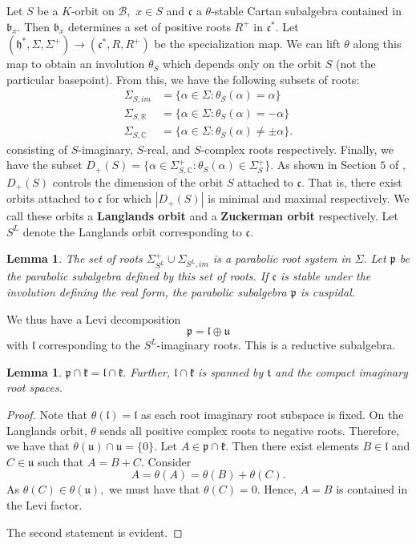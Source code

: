 \documentclass[letterpaper,twosided,11pt]{article}
\theoremstyle{plain}
\newtheorem{lemma}[theorem]{Lemma}
\theoremstyle{definition}
\theoremstyle{remark}
\newcommand{\C}{\mathbb{C}}
\newcommand{\R}{\mathbb{R}}
\newcommand{\ds}{\oplus}
\newcommand{\lie}[1]{\mathfrak{#1}}
\begin{document}
 Let $ S $
be a $ K $-orbit on $ \mathcal{B}, $ $ x\in S $ and $ \lie{c} $ a $
\theta $-stable Cartan subalgebra contained in $ \lie{b}_x. $ Then $
\lie{b}_x $ determines a set of positive roots $ R^+ $ in $ \lie{c}^*. $
Let $ (\lie{h}^*,\Sigma, \Sigma^+)\to (\lie{c}^*,R,R^+) $ be the
specialization map.  We can lift $ \theta $ along this map to obtain an
involution $ \theta_S $ which depends only on the orbit $ S $ (not the
particular basepoint).  From this, we have the following subsets of
roots:
\begin{align*}
    \Sigma_{S,im}&=\{\alpha\in \Sigma:  \theta_S(\alpha)=\alpha\} \\
    \Sigma_{S,\R}&=\{\alpha\in \Sigma:\theta_S(\alpha)=-\alpha\} \\
    \Sigma_{S,\C}&=\{\alpha\in \Sigma:  \theta_S(\alpha)\neq \pm \alpha\}.
\end{align*}
consisting of $ S $-imaginary, $ S $-real, and $ S $-complex roots
respectively.  Finally, we have the subset $ D_+(S)=\{ \alpha\in \Sigma_
{S,\C}^+:  \theta_S(\alpha)\in \Sigma^+_{S}\}. $ As shown in Section $ 5
$ of
\cite{Hecht2022}, $ D_+(S) $ controls the dimension of the orbit $ S $
attached to $ \lie{c}. $ That is, there exist orbits attached to $ \lie{c}
$ for which $ |D_+(S)| $ is minimal and maximal respectively.  We call
these orbits a \textbf{Langlands orbit} and a \textbf{Zuckerman orbit}
respectively.  Let $ S^L $ denote the Langlands orbit corresponding to $
\lie{c}. $

\begin{lemma}
    \cite[Section 5]{Hecht2022} The set of roots $ \Sigma^+_{S^L}\cup
    \Sigma_{S^L,im} $ is a parabolic root system in $ \Sigma. $ Let $
    \lie{p} $ be the parabolic subalgebra defined by this set of roots.
    If $ \lie{c} $ is stable under the involution defining the real
    form, the parabolic subalgebra $ \lie{p} $ is cuspidal.
\end{lemma}

We thus have a Levi decomposition \[ \lie{p}=\lie{l}\ds \lie{u}\]
with $\lie{l}$ corresponding to the $S^L$-imaginary roots. 
This is a reductive subalgebra. 

\begin{lemma}\label{Intersection_with_k}
	$\lie{p}\cap \lie{k}=\lie{l}\cap \lie{k}.$ Further, $\lie{l}\cap \lie{k}$ is spanned by $\lie{t}$ 
	and the compact imaginary root spaces. 
\end{lemma}   
\begin{proof} 
	Note that $\theta(\lie{l})=\lie{l}$ as each root imaginary root subspace is fixed. 
	On the Langlands orbit, $\theta$ sends all positive complex roots to negative roots. 
	Therefore, we have that $\theta(\lie{u})\cap \lie{u}=\{0\}.$ Let $A\in \lie{p}\cap \lie{k}.$
	 Then there exist elements $B\in \lie{l}$ and $C\in \lie{u}$ such that 
	 $ A=B+C.$ Consider \[ A=\theta(A)=\theta(B)+\theta(C).\]
	 As $\theta(C)\in \theta(\lie{u}),$ we must have that $\theta(C)=0.$ Hence, $A=B$ is 
	 contained in the Levi factor. 
	 
	 The second statement is evident. 
\end{proof} 
\end{document}
